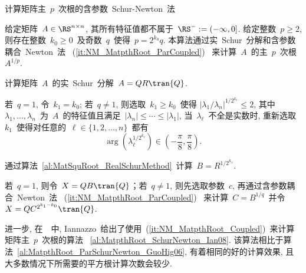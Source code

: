 \begin{algorithm}[h!]
\caption{计算矩阵主~$p$~次根的含参数~Schur-Newton~法~\cite[算法~
3.3]{GuoHigham2006}} \label{al:MatpthRoot_ParSchurNewton_GuoHig06}
给定矩阵~$A\in\RS^{n\times n}$, 其所有特征值都不属于~$\RS^- :=
(-\infty,0]$. 给定整数~$p\geq 2$, 则存在整数~$k_0 \geq
0$~及奇数~$q$~使得~$p = 2^{k_0}q$.
本算法通过实~Schur~分解和含参数耦合~Newton~法~
(\ref{it:NM_MatpthRoot_ParCoupled})~
来计算~$A$~的主~$p$~次根~$A^{1/p}$.
\begin{list}{.}{
\setlength{\rightmargin}{0em}\setlength{\leftmargin}{1.2em}}
\item
计算矩阵~$A$~的实~Schur~分解~$A = QR\tran{Q}$.
\item
若~$q=1$, 令~$k_1 = k_0$; 若~$q\neq1$, 则选取~$k_1\geq k_0$~使得
$|\lambda_1/\lambda_n|^{1/2^{k_1}}\leq 2$, 其中~$\lambda_1,\ldots,
\lambda_n$~为~$A$~的特征值且满足~$|\lambda_n|\leq \cdots \leq
|\lambda_1|$, 当~$\lambda_\ell$~不全是实数时,
重新选取~$k_1$~使得对任意的~$\ell \in \{1,2,\ldots,n\}$~都有
$$
\arg(\lambda_\ell^{1/2^{k_1}}) \in
\left(-\frac{\pi}{8},\frac{\pi}{8}\right).
$$
\item
通过算法~\ref{al:MatSquRoot_RealSchurMethod}~计算~$B =
R^{1/{2^{k_1}}}$.
\item
若~$q=1$, 则令~$X = QB\tran{Q}$；若~$q\neq 1$, 则先选取参数~$c$,
再通过含参数耦合~Newton~法~ (\ref{it:NM_MatpthRoot_ParCoupled})~
来计算~$C = B^{1/q}$~并令~$X = QC^{2^{k_1-k_0}}\tran{Q}$.
\end{list}
\end{algorithm}

进一步, 在~\cite{Iannazzo2008}~中,
Iannazzo~给出了使用~(\ref{it:NM_MatpthRoot_Coupled})~来计算矩阵主~$p$~次根的算法~
\ref{al:MatpthRoot_SchurNewton_Ian08}.
该算法相比于算法~\ref{al:MatpthRoot_ParSchurNewton_GuoHig06},
有着相同的好的计算效果, 且大多数情况下所需要的平方根计算次数会较少.

